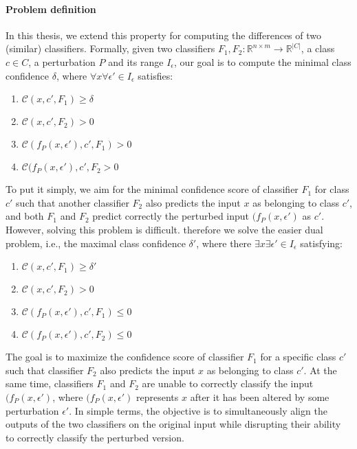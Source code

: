 \paragraph{Problem definition} 
In this thesis, we extend this property for computing the differences of two (similar) classifiers. 
Formally, given two classifiers $F_1,F_2: \mathbb{R}^{n \times m} \rightarrow {\mathbb{R}}^{|C|}$, a class $c\in{C}$, a perturbation $P$ and its range $I_\epsilon$, our goal is to compute the minimal class confidence $\delta$, where $\forall{x}\forall{\epsilon'}\in{I_{\epsilon}}$ satisfies:
\begin{enumerate}
    \item $\mathcal{C}(x,c',F_1) \geq \delta$ %
    \item $\mathcal{C}(x,c',F_2) > 0$
    \item $\mathcal{C}(f_P(x,\epsilon'),c',F_1)> 0$
    \item $\mathcal{C}(f_P(x,\epsilon'),c',F_2> 0$
\end{enumerate} 
To put it simply, we aim for the minimal confidence score of classifier $F_1$ for class $c'$ such that another classifier $F_2$ also predicts the input $x$ as belonging to class $c'$, and both $F_1$ and $F_2$ predict correctly the perturbed input $(f_P(x,\epsilon')$ as $c'$. However, solving this problem is difficult. therefore we solve the easier dual problem, i.e.,  the maximal class confidence $\delta'$, where there $\exists{x}\exists{\epsilon'}\in{I_\epsilon}$ satisfying:%
\begin{enumerate}
    \item $\mathcal{C}(x,c',F_1) \geq \delta'$ %
    \item $\mathcal{C}(x,c',F_2) > 0$
    \item $\mathcal{C}(f_P(x,\epsilon'),c',F_1)\leq 0$
    \item $\mathcal{C}(f_P(x,\epsilon'),c',F_2)\leq 0$
\end{enumerate} 
The goal is to maximize the confidence score of classifier $F_1$ for a specific class $c'$ such that classifier $F_2$ also predicts the input $x$ as belonging to class $c'$. At the same time, classifiers $F_1$ and $F_2$ are unable to correctly classify the input $(f_P(x,\epsilon')$, where $(f_P(x,\epsilon')$ represents $x$ after it has been altered by some perturbation $\epsilon'$. In simple terms, the objective is to simultaneously align the outputs of the two classifiers on the original input while disrupting their ability to correctly classify the perturbed version. 
